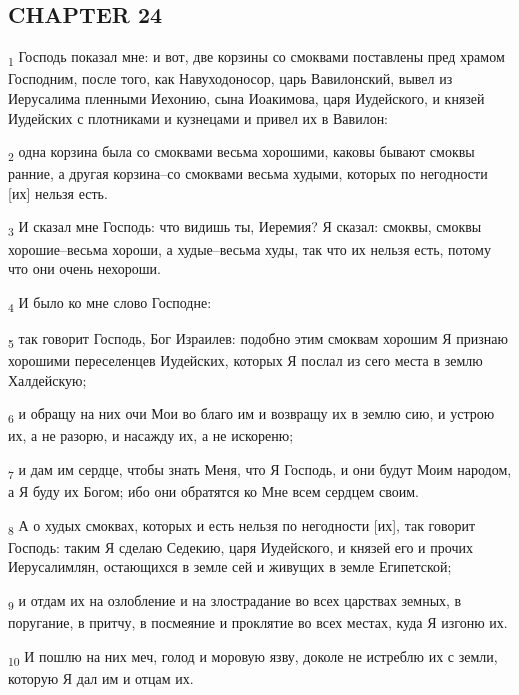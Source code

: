 \subsection{CHAPTER 24}
\begin{tcolorbox}
\textsubscript{1} Господь показал мне: и вот, две корзины со смоквами поставлены пред храмом Господним, после того, как Навуходоносор, царь Вавилонский, вывел из Иерусалима пленными Иехонию, сына Иоакимова, царя Иудейского, и князей Иудейских с плотниками и кузнецами и привел их в Вавилон:
\end{tcolorbox}
\begin{tcolorbox}
\textsubscript{2} одна корзина была со смоквами весьма хорошими, каковы бывают смоквы ранние, а другая корзина--со смоквами весьма худыми, которых по негодности [их] нельзя есть.
\end{tcolorbox}
\begin{tcolorbox}
\textsubscript{3} И сказал мне Господь: что видишь ты, Иеремия? Я сказал: смоквы, смоквы хорошие--весьма хороши, а худые--весьма худы, так что их нельзя есть, потому что они очень нехороши.
\end{tcolorbox}
\begin{tcolorbox}
\textsubscript{4} И было ко мне слово Господне:
\end{tcolorbox}
\begin{tcolorbox}
\textsubscript{5} так говорит Господь, Бог Израилев: подобно этим смоквам хорошим Я признаю хорошими переселенцев Иудейских, которых Я послал из сего места в землю Халдейскую;
\end{tcolorbox}
\begin{tcolorbox}
\textsubscript{6} и обращу на них очи Мои во благо им и возвращу их в землю сию, и устрою их, а не разорю, и насажду их, а не искореню;
\end{tcolorbox}
\begin{tcolorbox}
\textsubscript{7} и дам им сердце, чтобы знать Меня, что Я Господь, и они будут Моим народом, а Я буду их Богом; ибо они обратятся ко Мне всем сердцем своим.
\end{tcolorbox}
\begin{tcolorbox}
\textsubscript{8} А о худых смоквах, которых и есть нельзя по негодности [их], так говорит Господь: таким Я сделаю Седекию, царя Иудейского, и князей его и прочих Иерусалимлян, остающихся в земле сей и живущих в земле Египетской;
\end{tcolorbox}
\begin{tcolorbox}
\textsubscript{9} и отдам их на озлобление и на злострадание во всех царствах земных, в поругание, в притчу, в посмеяние и проклятие во всех местах, куда Я изгоню их.
\end{tcolorbox}
\begin{tcolorbox}
\textsubscript{10} И пошлю на них меч, голод и моровую язву, доколе не истреблю их с земли, которую Я дал им и отцам их.
\end{tcolorbox}
